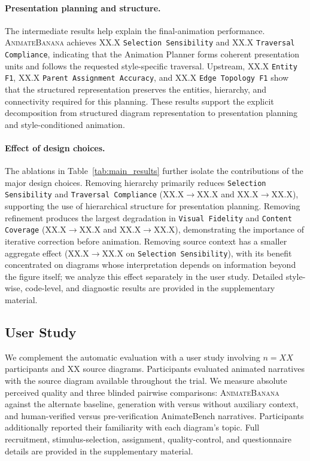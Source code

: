 \documentclass{article} %
\begin{document}
\paragraph{Presentation planning and structure.}
The intermediate results help explain the final-animation performance.
\textsc{AnimateBanana} achieves XX.X \texttt{Selection Sensibility} and XX.X
\texttt{Traversal Compliance}, indicating that the Animation Planner forms
coherent presentation units and follows the requested style-specific traversal.
Upstream, XX.X \texttt{Entity F1}, XX.X \texttt{Parent Assignment Accuracy},
and XX.X \texttt{Edge Topology F1} show that the structured representation
preserves the entities, hierarchy, and connectivity required for this
planning. These results support the explicit decomposition from structured
diagram representation to presentation planning and style-conditioned
animation.

\paragraph{Effect of design choices.}
The ablations in Table~\ref{tab:main_results} further isolate the contributions
of the major design choices. Removing hierarchy primarily reduces
\texttt{Selection Sensibility} and \texttt{Traversal Compliance}
(XX.X$\rightarrow$XX.X and XX.X$\rightarrow$XX.X), supporting the use of
hierarchical structure for presentation planning. Removing refinement produces
the largest degradation in \texttt{Visual Fidelity} and \texttt{Content
Coverage} (XX.X$\rightarrow$XX.X and XX.X$\rightarrow$XX.X), demonstrating
the importance of iterative correction before animation. Removing source
context has a smaller aggregate effect (XX.X$\rightarrow$XX.X on
\texttt{Selection Sensibility}), with its benefit concentrated on diagrams
whose interpretation depends on information beyond the figure itself; we
analyze this effect separately in the user study. Detailed style-wise,
code-level, and diagnostic results are provided in the supplementary material.


\subsection{User Study}
\label{subsec:user_study}

We complement the automatic evaluation with a user study involving $n=XX$
participants and XX source diagrams. Participants evaluated animated
narratives with the source diagram available throughout the trial. We measure
absolute perceived quality and three blinded pairwise comparisons:
\textsc{AnimateBanana} against the alternate baseline, generation with versus
without auxiliary context, and human-verified versus pre-verification
AnimateBench narratives. Participants additionally reported their familiarity
with each diagram's topic. Full recruitment, stimulus-selection, assignment,
quality-control, and questionnaire details are provided in the supplementary
material.
\end{document}
